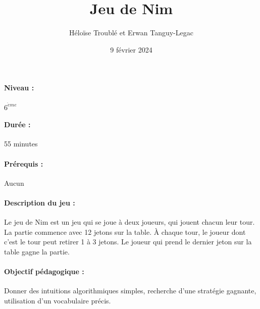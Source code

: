 \documentclass[12pt, a4paper]{article}
\begin{document}
	
	\title{Jeu de Nim}
	\author{Héloïse Troublé et Erwan Tanguy-Legac}
	\date{9 février 2024}
	\maketitle
	
	\paragraph*{Niveau :} $6^{\grave{e}me}$
	\paragraph*{Durée :} 55 minutes
	\paragraph*{Prérequis :} Aucun
	\paragraph*{Description du jeu :}
	Le jeu de Nim est un jeu qui se joue à deux joueurs, qui jouent chacun leur tour. La partie commence avec 12 jetons sur la table. À chaque tour, le joueur dont c'est le tour peut retirer 1 à 3 jetons. Le joueur qui prend le dernier jeton sur la table gagne la partie.
	
	\paragraph*{Objectif pédagogique :}
	Donner des intuitions algorithmiques simples, recherche d'une stratégie gagnante, utilisation d'un vocabulaire précis.
	
\end{document}
